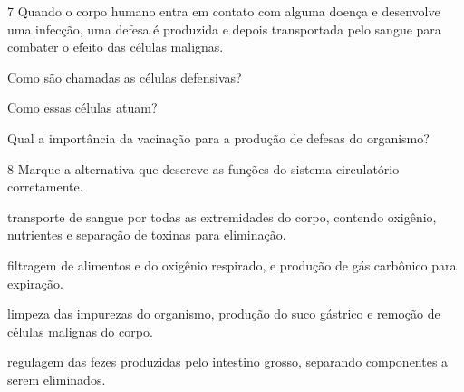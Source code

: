 
\num{7} Quando o corpo humano entra em contato com alguma doença e
desenvolve uma infecção, uma defesa é produzida e depois transportada
pelo sangue para combater o efeito das células malignas.

\begin{escolha}
\item Como são chamadas as células defensivas?



\item Como essas células atuam?



\item Qual a importância da vacinação para a produção de defesas do organismo?


\end{escolha}

\num{8} Marque a alternativa que descreve as funções do sistema circulatório corretamente.

\begin{escolha}
\item transporte de sangue por todas as extremidades do corpo, contendo
oxigênio, nutrientes e separação de toxinas para eliminação.

\item filtragem de alimentos e do oxigênio respirado, e produção de gás
carbônico para expiração.

\item limpeza das impurezas do organismo, produção do suco gástrico e
remoção de células malignas do corpo.

\item regulagem das fezes produzidas pelo intestino grosso, separando
componentes a serem eliminados.
\end{escolha}

